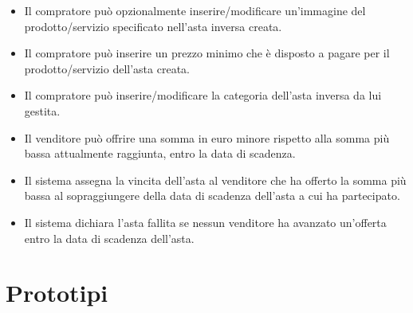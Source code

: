 \begin{itemize}
\begin{itemize}
                \item Il compratore può opzionalmente inserire/modificare un'immagine del prodotto/servizio specificato nell'asta inversa creata.
                \item Il compratore può inserire un prezzo minimo che è disposto a pagare per il prodotto/servizio dell'asta creata.
                \item Il compratore può inserire/modificare la categoria dell'asta inversa da lui gestita.
                \item Il venditore può offrire una somma in euro minore rispetto alla somma più bassa attualmente raggiunta, entro la data di scadenza.
                \item Il sistema assegna la vincita dell'asta al venditore che ha offerto la somma più bassa al sopraggiungere della data di scadenza dell'asta a cui ha partecipato.
                \item Il sistema dichiara l'asta fallita se nessun venditore ha avanzato un'offerta entro la data di scadenza dell'asta.
            \end{itemize}
        \end{itemize}

     \section{Prototipi}